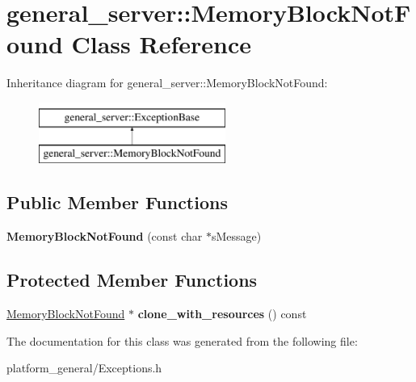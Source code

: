 \hypertarget{classgeneral__server_1_1MemoryBlockNotFound}{\section{general\-\_\-server\-:\-:\-Memory\-Block\-Not\-Found \-Class \-Reference}
\label{classgeneral__server_1_1MemoryBlockNotFound}
}
\-Inheritance diagram for general\-\_\-server\-:\-:\-Memory\-Block\-Not\-Found\-:\begin{figure}[H]
\begin{center}
\leavevmode
\includegraphics[height=2.000000cm]{classgeneral__server_1_1MemoryBlockNotFound}
\end{center}
\end{figure}
\subsection*{\-Public \-Member \-Functions}
\begin{DoxyCompactItemize}
\item 
\hypertarget{classgeneral__server_1_1MemoryBlockNotFound_a6d0d66a542651756d55bd0098dd6860e}{{\bfseries \-Memory\-Block\-Not\-Found} (const char $\ast$s\-Message)}\label{classgeneral__server_1_1MemoryBlockNotFound_a6d0d66a542651756d55bd0098dd6860e}

\end{DoxyCompactItemize}
\subsection*{\-Protected \-Member \-Functions}
\begin{DoxyCompactItemize}
\item 
\hypertarget{classgeneral__server_1_1MemoryBlockNotFound_a3249688efcfa926918af8fdee848b7ef}{\hyperlink{classgeneral__server_1_1MemoryBlockNotFound}{\-Memory\-Block\-Not\-Found} $\ast$ {\bfseries clone\-\_\-with\-\_\-resources} () const }\label{classgeneral__server_1_1MemoryBlockNotFound_a3249688efcfa926918af8fdee848b7ef}

\end{DoxyCompactItemize}


\-The documentation for this class was generated from the following file\-:\begin{DoxyCompactItemize}
\item 
platform\-\_\-general/\-Exceptions.\-h\end{DoxyCompactItemize}
